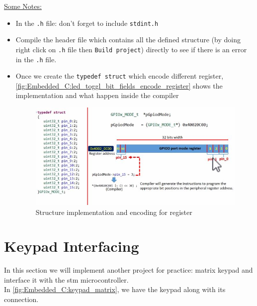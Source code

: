 \newpage
\underline{Some Notes:}

\begin{itemize}
    \item In the \verb|.h| file: don't forget to include \verb|stdint.h|
    
    \item Compile the header file which contains all the defined structure (by doing right click on \verb|.h| file then \verb|Build project|) directly to see if there is an error in the \verb|.h| file.
    
    
    \item Once we create the \verb|typedef struct| which encode different register, \autoref{fig:Embedded_C:led_toggl_bit_fields_encode_register} shows the implementation and what happen inside the compiler
    
    \begin{figure}[h]
\centering
\includegraphics[scale=0.55]{Figures/Embedded_C/led_toggl_bit_fields_encode_register}
\caption{Structure implementation and encoding for register}
\label{fig:Embedded_C:led_toggl_bit_fields_encode_register}
\end{figure}
    
    
\end{itemize}

\newpage

\section{Keypad Interfacing}

In this section we will implement another project for practice: matrix keypad and interface it with the stm microcontroller.\\

In \autoref{fig:Embedded_C:keypad_matrix}, we have the keypad along with its connection.

